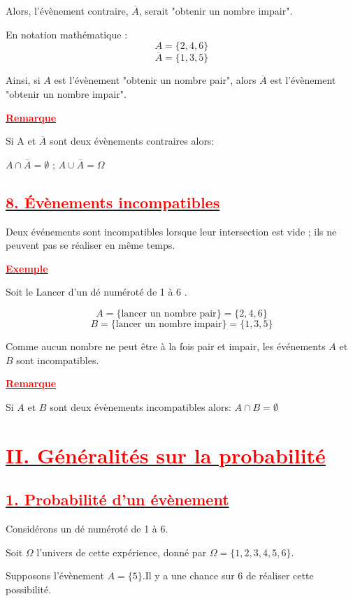 \documentclass[12pt]{article}
\begin{document}
Alors, l'évènement contraire, $\overline{A}$, serait "obtenir un nombre impair".

En notation mathématique :
\[ A = \{2, 4, 6\} \]
\[ \overline{A} = \{1, 3, 5\} \]

Ainsi, si $A$ est l'évènement "obtenir un nombre pair", alors $\overline{A}$ est l'évènement "obtenir un nombre impair".

\underline{\textbf{\textcolor{red}{Remarque}}}

Si A et $\overline{A}$ sont deux évènements contraires alors:

$A\cap\overline{A}=\emptyset$ ; $A\cup\overline{A}=\Omega$

\subsection*{\underline{\textbf{\textcolor{red}{8. Évènements incompatibles}}}}

Deux événements sont incompatibles lorsque leur intersection est vide ; ils ne peuvent pas se réaliser en
même temps.

\underline{\textbf{\textcolor{red}{Exemple}}}

Soit le Lancer d’un dé numéroté de 1 à 6 .

\[ A = \{\text{lancer un nombre pair}\} = \{2, 4, 6\} \]
\[ B = \{\text{lancer un nombre impair}\} = \{1, 3, 5\} \]

Comme aucun nombre ne peut être à la fois pair et impair, les événements \(A\) et \(B\) sont incompatibles.

\underline{\textbf{\textcolor{red}{Remarque}}}

Si $A$ et $B$ sont deux évènements incompatibles alors: $A\cap B=\emptyset$ 

\section*{\underline{\textbf{\textcolor{red}{II. Généralités sur la probabilité}}}}

\subsection*{\underline{\textbf{\textcolor{red}{1. Probabilité d'un évènement}}}}

Considérons un dé numéroté de 1 à 6.

Soit $\Omega$ l'univers de cette expérience, donné par $\Omega=\{1, 2, 3, 4, 5, 6\}$.

Supposons l'évènement $A=\{5\}$.Il y a une chance sur 6 de réaliser cette possibilité.
\end{document}
